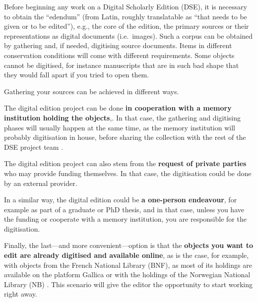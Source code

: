 \documentclass[
  letterpaper,
  DIV=11,
  numbers=noendperiod]{scrreprt}
\begin{document}
Before beginning any work on a Digital Scholarly Edition (DSE), it is
necessary to obtain the ``edendum'' (from Latin, roughly translatable as
``that needs to be given or to be edited''), e.g., the core of the
edition, the primary sources or their representations as digital
documents (i.e.~images). Such a corpus can be obtained by gathering and,
if needed, digitising source documents. Items in different conservation
conditions will come with different requirements. Some objects cannot be
digitised, for instance manuscripts that are in such bad shape that they
would fall apart if you tried to open them.\hl{}

Gathering your sources can be achieved in different ways.

The digital edition project can be done \textbf{in cooperation with a
memory institution holding the objects},. In that case, the gathering
and digitising phases will usually happen at the same time, as the
memory institution will probably digitisation in house, before sharing
the collection with the rest of the DSE project team .

The digital edition project can also stem from the \textbf{request of
private parties} who may provide funding themselves. In that case, the
digitisation could be done by an external provider.

In a similar way, the digital edition could be \textbf{a one-person
endeavour}, for example as part of a graduate or PhD thesis, and in that
case, unless you have the funding or cooperate with a memory
institution, you are responsible for the digitisation.

Finally, the last---and more convenient---option is that the
\textbf{objects you want to edit are already digitised and available
online}, as is the case, for example, with objects from the French
National Library (BNF), as most of its holdings are available on the
platform Gallica or with the holdings of the Norwegian National Library
(NB) . This scenario will give the editor the opportunity to start
working right away.
\end{document}
